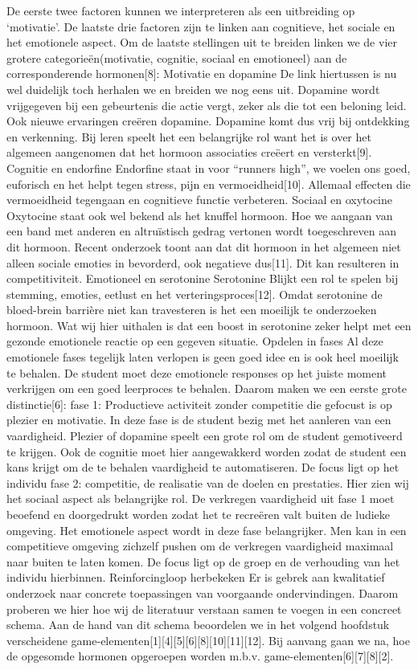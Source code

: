 \documentclass{hogent-article}
\begin{document}
De eerste twee factoren kunnen we interpreteren als een uitbreiding op ‘motivatie’. De laatste drie factoren zijn te linken aan cognitieve, het sociale en het emotionele aspect.
Om de laatste stellingen uit te breiden linken we de vier grotere categorieën(motivatie, cognitie, sociaal en emotioneel) aan de corresponderende hormonen[8]:
Motivatie en dopamine
De link hiertussen is nu wel duidelijk toch herhalen we en breiden we nog eens uit. Dopamine wordt vrijgegeven bij een gebeurtenis die actie vergt, zeker als die tot een beloning leid. Ook nieuwe ervaringen creëren dopamine. Dopamine komt dus vrij bij ontdekking en verkenning. Bij leren speelt het een belangrijke rol want het is over het algemeen aangenomen dat het hormoon associaties creëert en versterkt[9].
Cognitie en endorfine
Endorfine staat in voor “runners high”, we voelen ons goed, euforisch en het helpt tegen stress, pijn en vermoeidheid[10]. Allemaal effecten die vermoeidheid tegengaan en cognitieve functie verbeteren.
Sociaal en oxytocine
Oxytocine staat ook wel bekend als het knuffel hormoon. Hoe we aangaan van een band met anderen en altruïstisch gedrag vertonen wordt toegeschreven aan dit hormoon. Recent onderzoek toont aan dat dit hormoon in het algemeen niet alleen sociale emoties in bevorderd, ook negatieve dus[11]. Dit kan resulteren in competitiviteit.
Emotioneel en serotonine
Serotonine Blijkt een rol te spelen bij stemming, emoties, eetlust en het verteringsproces[12]. Omdat serotonine de bloed-brein barrière niet kan travesteren is het een moeilijk te onderzoeken hormoon. Wat wij hier uithalen is dat een boost in serotonine zeker helpt met een gezonde emotionele reactie op een gegeven situatie.
Opdelen in fases
Al deze emotionele fases tegelijk laten verlopen is geen goed idee en is ook heel moeilijk te behalen. De student moet deze emotionele responses op het juiste moment verkrijgen om een goed leerproces te behalen. Daarom maken we een eerste grote distinctie[6]:
fase 1: Productieve activiteit zonder competitie die gefocust is op plezier en motivatie.
In deze fase is de student bezig met het aanleren van een vaardigheid. Plezier of dopamine speelt een grote rol om de student gemotiveerd te krijgen. Ook de cognitie moet hier aangewakkerd worden zodat de student een kans krijgt om de te behalen vaardigheid te automatiseren. De focus ligt op het individu
fase 2: competitie, de realisatie van de doelen en prestaties.
Hier zien wij het sociaal aspect als belangrijke rol. De verkregen vaardigheid uit fase 1 moet beoefend en doorgedrukt worden zodat het te recreëren valt buiten de ludieke omgeving. Het emotionele aspect wordt in deze fase belangrijker. Men kan in een competitieve omgeving zichzelf pushen om de verkregen vaardigheid maximaal naar buiten te laten komen. De focus ligt op de groep en de verhouding van het individu hierbinnen.
Reinforcingloop herbekeken
Er is gebrek aan kwalitatief onderzoek naar concrete toepassingen van voorgaande ondervindingen. Daarom proberen we hier hoe wij de literatuur verstaan samen te voegen in een concreet schema. Aan de hand van dit schema beoordelen we in het volgend hoofdstuk verscheidene game-elementen[1][4][5][6][8][10][11][12].
Bij aanvang gaan we na, hoe de opgesomde hormonen opgeroepen worden m.b.v. game-elementen[6][7][8][2].
\end{document}
